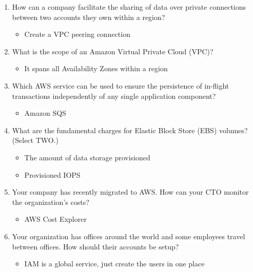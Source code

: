 \begin{enumerate}
	\item How can a company facilitate the sharing of data over private connections between two accounts they own within a region?

	\begin{itemize}
	\item Create a VPC peering connection
\end{itemize}

	\item What is the scope of an Amazon Virtual Private Cloud (VPC)?

	\begin{itemize}
	\item It spans all Availability Zones within a region
\end{itemize}

	\item Which AWS service can be used to ensure the persistence of in-flight transactions independently of any single application component?

	\begin{itemize}
	\item Amazon SQS
\end{itemize}

	\item What are the fundamental charges for Elastic Block Store (EBS) volumes? (Select TWO.)

	\begin{itemize}
	\item The amount of data storage provisioned
	\item Provisioned IOPS
\end{itemize}

	\item Your company has recently migrated to AWS. How can your CTO monitor the organization’s costs?

	\begin{itemize}
	\item AWS Cost Explorer
\end{itemize}

	\item Your organization has offices around the world and some employees travel between offices. How should their accounts be setup?

	\begin{itemize}
	\item IAM is a global service, just create the users in one place
\end{itemize}


\end{enumerate}
